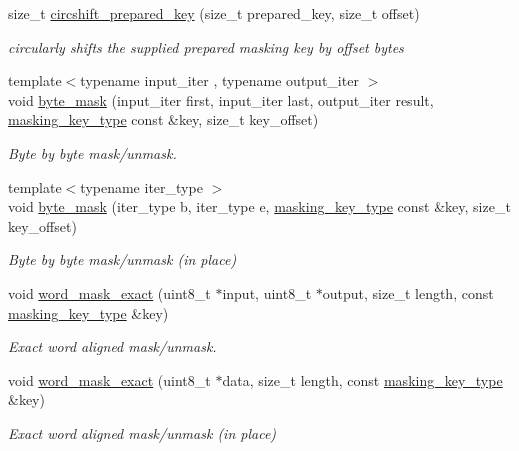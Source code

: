 \begin{DoxyCompactItemize}
size\+\_\+t \hyperlink{namespacewebsocketpp_1_1frame_a76bf120d54d47d760eb8bd803572b004}{circshift\+\_\+prepared\+\_\+key} (size\+\_\+t prepared\+\_\+key, size\+\_\+t offset)
\begin{DoxyCompactList}\small\item\em circularly shifts the supplied prepared masking key by offset bytes \end{DoxyCompactList}\item 
{\footnotesize template$<$typename input\+\_\+iter , typename output\+\_\+iter $>$ }\\void \hyperlink{namespacewebsocketpp_1_1frame_a417650d76aa2433163942d6a13334a6a}{byte\+\_\+mask} (input\+\_\+iter first, input\+\_\+iter last, output\+\_\+iter result, \hyperlink{unionwebsocketpp_1_1frame_1_1uint32__converter}{masking\+\_\+key\+\_\+type} const \&key, size\+\_\+t key\+\_\+offset)
\begin{DoxyCompactList}\small\item\em Byte by byte mask/unmask. \end{DoxyCompactList}\item 
{\footnotesize template$<$typename iter\+\_\+type $>$ }\\void \hyperlink{namespacewebsocketpp_1_1frame_a57740a0ac6dca6789eb3d020b7f31ed8}{byte\+\_\+mask} (iter\+\_\+type b, iter\+\_\+type e, \hyperlink{unionwebsocketpp_1_1frame_1_1uint32__converter}{masking\+\_\+key\+\_\+type} const \&key, size\+\_\+t key\+\_\+offset)
\begin{DoxyCompactList}\small\item\em Byte by byte mask/unmask (in place) \end{DoxyCompactList}\item 
void \hyperlink{namespacewebsocketpp_1_1frame_acb2ccda66981a8a12a3b97fb4b179aa3}{word\+\_\+mask\+\_\+exact} (uint8\+\_\+t $\ast$input, uint8\+\_\+t $\ast$output, size\+\_\+t length, const \hyperlink{unionwebsocketpp_1_1frame_1_1uint32__converter}{masking\+\_\+key\+\_\+type} \&key)
\begin{DoxyCompactList}\small\item\em Exact word aligned mask/unmask. \end{DoxyCompactList}\item 
void \hyperlink{namespacewebsocketpp_1_1frame_ab5cb468072d1f3f4b430eb2e0baff69d}{word\+\_\+mask\+\_\+exact} (uint8\+\_\+t $\ast$data, size\+\_\+t length, const \hyperlink{unionwebsocketpp_1_1frame_1_1uint32__converter}{masking\+\_\+key\+\_\+type} \&key)
\begin{DoxyCompactList}\small\item\em Exact word aligned mask/unmask (in place) \end{DoxyCompactList}\item 

\end{DoxyCompactItemize}
